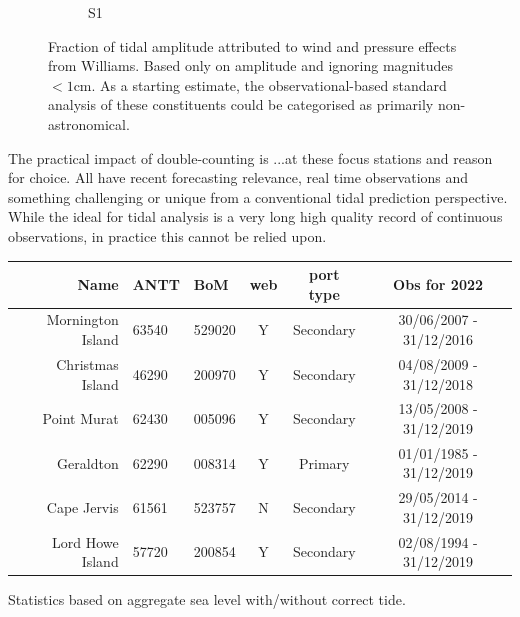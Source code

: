 \begin{figure}[H]
\begin{subfigure}[b]{\figwidthHalf}
        \caption{S1}
    \end{subfigure}
    \caption{Fraction of tidal amplitude attributed to wind and pressure effects from Williams\cite{10.5194/os-2020-107}.  Based only on amplitude and ignoring magnitudes $<1$cm.  As a starting estimate, the observational-based standard analysis of these constituents could be categorised as primarily non-astronomical.}
    \label{fig:williamsFraction}
\end{figure}



The practical impact of double-counting is ...at these focus stations and reason for choice.
All have recent forecasting relevance, real time observations and something challenging or unique from a conventional tidal prediction perspective.
While the ideal for tidal analysis is a very long high quality record of continuous observations, in practice this cannot be relied upon.



\begin{table}[H]\centering
\begin{tabular}{ r|p{1cm}|p{1.2cm}|c|c|c }
Name 
 & ANTT 
 & BoM 
 & web  
 & port type
 & Obs for 2022
  \\ 
\toprule
Mornington Island 
 & 63540 
 & 529020 
 & Y 
 & Secondary 
 & 30/06/2007 - 31/12/2016
 \\
Christmas Island  
 & 46290 
 & 200970 
 & Y 
 & Secondary 
 & 04/08/2009 - 31/12/2018
 \\
Point Murat       
 & 62430 
 & 005096 
 & Y 
 & Secondary 
 & 13/05/2008 - 31/12/2019
 \\
Geraldton         
 & 62290 
 & 008314 
 & Y
 & Primary   
 & 01/01/1985 - 31/12/2019
 \\
Cape Jervis       
 & 61561 
 & 523757 
 & N 
 & Secondary
 & 29/05/2014 - 31/12/2019
 \\
Lord Howe Island  
 & 57720 
 & 200854  
 & Y 
 & Secondary 
 & 02/08/1994 - 31/12/2019
 
 \\
\end{tabular}
\label{tab:sites}
\end{table}


Statistics based on aggregate sea level with/without correct tide.


